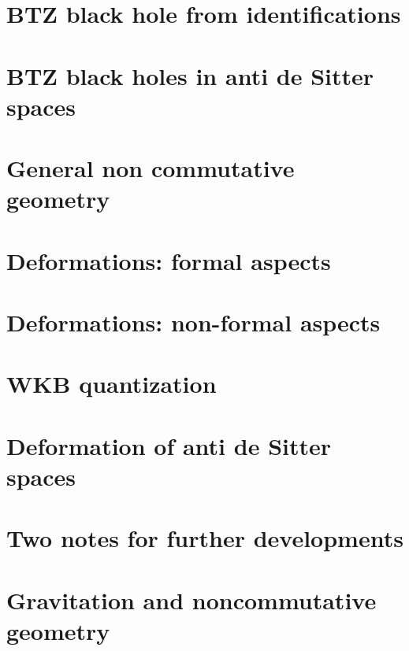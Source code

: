 \chapter{BTZ black hole from identifications}




\chapter{BTZ black holes in anti de Sitter spaces}                  \label{ChapBHinAdS}
%
%










\chapter{General non commutative geometry}




\chapter{Deformations: formal aspects}          \label{ChapDefo}


\chapter{Deformations: non-formal aspects}


      

\chapter{WKB quantization}


\chapter{Deformation of anti de Sitter spaces}   \label{ChDefoBH}


\chapter{Two notes for further developments}        \label{ChapNoteDev}



\chapter{Gravitation and noncommutative geometry}


